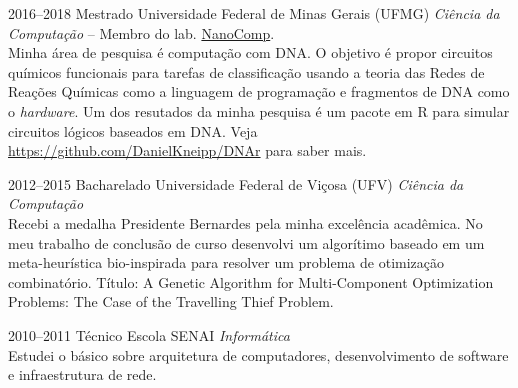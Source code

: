 \documentclass[a4paper]{cv-friggeri-x}
\begin{document}
\begin{entrylist}

\entry
    {2016--2018}
    {Mestrado}
    {Universidade Federal de Minas Gerais (UFMG)}
    {\emph{Ciência da Computação} --
    \footnotesize{Membro do lab. \href{http://www.nanocomp.dcc.ufmg.br/}{NanoComp}.}\\
    \normalsize{Minha área de pesquisa é computação com DNA. O objetivo é propor circuitos químicos funcionais para tarefas de classificação usando a teoria das Redes de Reações Químicas como a linguagem de programação e fragmentos de DNA como o \textit{hardware}. Um dos resutados da minha pesquisa é um pacote em R para simular circuitos lógicos baseados em DNA. Veja \href{https://github.com/DanielKneipp/DNAr}{https://github.com/DanielKneipp/DNAr} para saber mais.}}

\entry
    {2012--2015}
    {Bacharelado}
    {Universidade Federal de Vi\c cosa (UFV)}
    {\emph{Ciência da Computação}\\
    Recebi a medalha Presidente Bernardes pela minha excelência acadêmica. No meu trabalho de conclusão de curso desenvolvi um algorítimo baseado em um meta-heurística bio-inspirada para resolver um problema de otimização combinatório. Título: A Genetic Algorithm for Multi-Component Optimization Problems: The Case of the Travelling Thief Problem.}


\entry
    {2010--2011}
    {Técnico}
    {Escola SENAI}
    {\emph{Informática}\\
    Estudei o básico sobre arquitetura de computadores, desenvolvimento de software e infraestrutura de rede.}



\end{entrylist}

\end{document}
